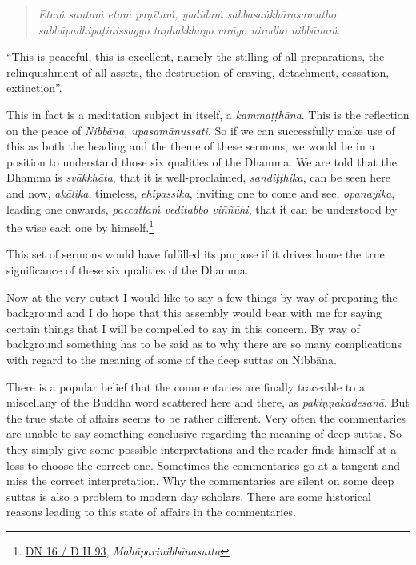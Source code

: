 \begin{quote}
\emph{Etaṁ santaṁ etaṁ paṇītaṁ, yadidaṁ sabbasaṅkhārasamatho sabbūpadhipaṭinissaggo taṇhakkhayo virāgo nirodho nibbānaṁ}.
\end{quote}

``This is peaceful, this is excellent, namely the stilling of all preparations, the relinquishment of all assets, the destruction of craving, detachment, cessation, extinction''.

This in fact is a meditation subject in itself, a \emph{kammaṭṭhāna}. This is the reflection on the peace of \emph{Nibbāna, upasamānussati}. So if we can successfully make use of this as both the heading and the theme of these sermons, we would be in a position to understand those six qualities of the Dhamma. We are told that the Dhamma is \emph{svākkhāta}, that it is well-proclaimed, \emph{sandiṭṭhika}, can be seen here and now, \emph{akālika}, timeless, \emph{ehipassika}, inviting one to come and see, \emph{opanayika}, leading one onwards, \emph{paccattaṁ veditabbo viññūhi}, that it can be understood by the wise each one by himself.\footnote{\href{https://suttacentral.net/dn16/pli/ms}{DN 16 / D II 93}, \emph{Mahāparinibbānasutta}}

This set of sermons would have fulfilled its purpose if it drives home the true significance of these six qualities of the Dhamma.

Now at the very outset I would like to say a few things by way of preparing the background and I do hope that this assembly would bear with me for saying certain things that I will be compelled to say in this concern. By way of background something has to be said as to why there are so many complications with regard to the meaning of some of the deep suttas on Nibbāna.

There is a popular belief that the commentaries are finally traceable to a miscellany of the Buddha word scattered here and there, as \emph{pakiṇṇakadesanā}. But the true state of affairs seems to be rather different. Very often the commentaries are unable to say something conclusive regarding the meaning of deep suttas. So they simply give some possible interpretations and the reader finds himself at a loss to choose the correct one. Sometimes the commentaries go at a tangent and miss the correct interpretation. Why the commentaries are silent on some deep suttas is also a problem to modern day scholars. There are some historical reasons leading to this state of affairs in the commentaries.

